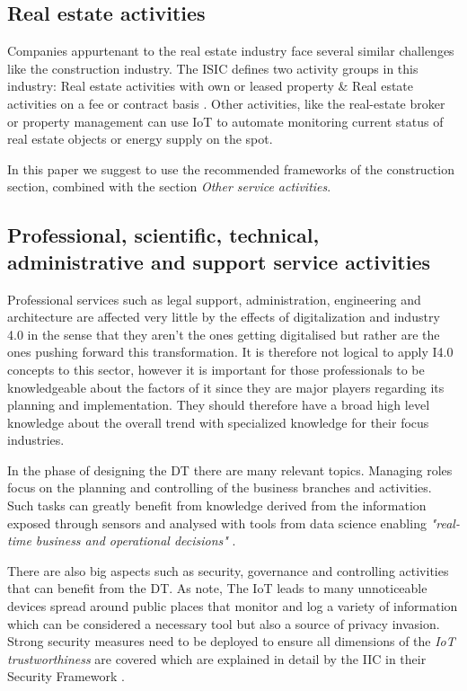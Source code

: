 \subsection{Real estate activities}

Companies appurtenant to the real estate industry face several similar challenges like the construction industry.
The \ac{ISIC} defines two activity groups in this industry: Real estate activities with own or leased property \& Real estate activities on a fee or contract basis \cite{ISIC:2008}. Other activities, like the real-estate broker or property management can use \ac{IoT} to automate monitoring current status of real estate objects or energy supply on the spot.

In this paper we suggest to use the recommended frameworks of the construction section, combined with the section \emph{Other service activities}. 

\subsection{Professional, scientific, technical, administrative and support service activities}
\label{subsec:profscience}


Professional services such as legal support, administration, engineering and architecture are affected very little by the effects of digitalization and industry 4.0 in the sense that they aren't the ones getting digitalised but rather are the ones pushing forward this transformation. It is therefore not logical to apply \ac{I4.0} concepts to this sector, however it is important for those professionals to be knowledgeable about the factors of it since they are major players regarding its planning and implementation. They should therefore have a broad high level knowledge about the overall trend with specialized knowledge for their focus industries.

In the phase of designing the \ac{DT} there are many relevant topics. Managing roles focus on the planning and controlling of the business branches and activities. Such tasks can greatly benefit from knowledge derived from the information exposed through sensors and analysed with tools from data science enabling \emph{"real-time business and operational decisions"} \cite[p.84]{iicarchitecture:2016}.

There are also big aspects such as security, governance and controlling activities that can benefit from the \ac{DT}. As \citeauthor{Tragos2016trusted} note, The \ac{IoT} leads to many unnoticeable devices spread around public places that monitor and log a variety of information which can be considered a necessary tool but also a source of privacy invasion. Strong security measures need to be deployed to ensure all dimensions of the \emph{\ac{IoT} trustworthiness} are covered which are explained in detail by the \ac{IIC} in their Security Framework \cite{iicsecurity:2016}.

